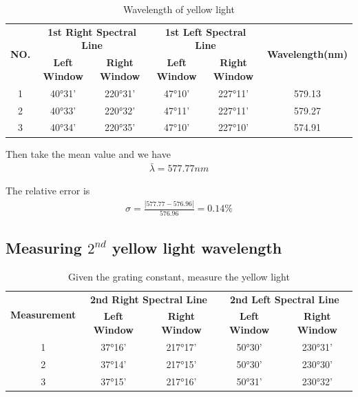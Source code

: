 \documentclass[UTF8]{article}
\begin{document}
   	 	\begin{table}[htbp]
   	 	  \centering
   	 	  \caption{Wavelength of yellow light}
   	 	  \begin{tabular}{cccccc}
   	 	    \toprule[2pt]
		   	 	    \multirow{2}{*}{\textbf{NO.}} & \multicolumn{2}{c}{\textbf{1st Right Spectral Line}} & \multicolumn{2}{c}{\textbf{1st Left Spectral Line}} &  \multirow{2}{*}{\textbf{Wavelength(nm)}}\\
   	 	    \cline{2-5}
   	 	    & \textbf{Left Window} & \textbf{Right Window} &  \textbf{Left Window} & \textbf{Right Window}&\\
   	 	    \midrule
		    1 & 40°31' & 220°31' & 47°10' & 227°11' & 579.13\\
		    2 & 40°33' & 220°32' & 47°11' & 227°11' & 579.27\\
		    3 & 40°34' & 220°35' & 47°10' & 227°10' & 574.91\\
   	 	    \bottomrule[2pt]
   	 	  \end{tabular}
   	 	\end{table}
   	 	
   	 	Then take the mean value and we have 
   	 	\begin{eqnarray}
   	 	\bar{\lambda} = 577.77 nm
   	 	\end{eqnarray}
   	 	
   	 	The relative error is
   	 	\begin{eqnarray}
   	 	\sigma = \frac{| 577.77 - 576.96|}{576.96} = 0.14\%
   	 	\end{eqnarray}
   	 
   
   \subsection{Measuring $2^{nd}$ yellow light wavelength}
   
   	 \begin{table}[htbp]
   	 	  \centering
   	 	  \caption{Given the grating constant, measure the yellow light}
   	 	  \begin{tabular}{ccccc}
   	 	    \toprule[2pt]
   	 	    \multirow{2}{*}{\textbf{Measurement}} & \multicolumn{2}{c}{\textbf{2nd Right Spectral Line}} & \multicolumn{2}{c}{\textbf{2nd Left Spectral Line}} \\
   	 	    \cline{2-5}
   	 	    & \textbf{Left Window} & \textbf{Right Window} &  \textbf{Left Window} & \textbf{Right Window}\\
   	 	    \midrule
		    1 & 37°16' & 217°17' & 50°30' & 230°31' \\
		    2 & 37°14' & 217°15' & 50°30' & 230°30' \\
		    3 & 37°15' & 217°16' & 50°31' & 230°32' \\
   	 	    \bottomrule[2pt]
   	 	  \end{tabular}
   	 	\end{table}
   	 	
\end{document}
